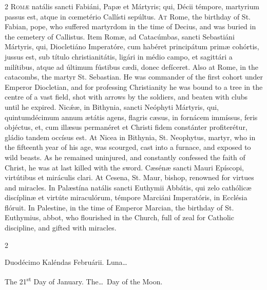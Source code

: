 \begin{paracol}{2}
\lettrine[lines=2]{R}{omæ} natális sancti Fabiáni, Papæ et Mártyris; 
 qui, Décii témpore, martyrium passus est, atque in cœmetério Callísti 
 sepúltus.
\switchcolumn
{}
\lettrine[lines=2]{A}{t} Rome, the birthday of St. Fabian, pope, who suffered martyrdom in the 
 time of Decius, and was buried in the cemetery of Callistus.
\switchcolumn*
{}
Item Romæ, ad Catacúmbas, sancti Sebastiáni 
 Mártyris, qui, Diocletiáno Imperatóre, cum habéret principátum primæ 
 cohórtis, jussus est, sub título christianitátis, ligári in médio campo, et 
 sagittári a milítibus, atque ad últimum fústibus cædi, donec defíceret.
\switchcolumn
{}
Also at Rome, in the catacombs, the martyr St. Sebastian. He was 
 commander of the first cohort under Emperor Diocletian, and for professing 
 Christianity he was bound to a tree in the centre of a vast field, shot with 
 arrows by the soldiers, and beaten with clubs until he expired.
\switchcolumn*
{}
Nicǽæ, in Bithynia, sancti Neóphyti Mártyris, 
 qui, quintumdécimum annum ætátis agens, flagris cæsus, in fornácem immíssus, 
 feris objéctus, et, cum illæsus permanéret et Christi fidem constánter 
 profiterétur, gládio tandem occísus est.
\switchcolumn
{}
At Nicea in Bithynia, St. Neophytus, martyr, who in the fifteenth year of 
 his age, was scourged, cast into a furnace, and exposed to wild beasts. 
 As he remained uninjured, and constantly confessed the faith of Christ, he 
 was at last killed with the sword.
\switchcolumn*
{}
Cæsénæ sancti Mauri Epíscopi, virtútibus et 
 miráculis clari.
\switchcolumn
{}
At Cesena, St. Maur, bishop, renowned for virtues and miracles.
\switchcolumn*
{}
In Palæstína natális sancti Euthymii Abbátis, 
 qui zelo cathólicæ discíplinæ et virtúte miraculórum, témpore Marciáni 
 Imperatóris, in Ecclésia flóruit.
\switchcolumn
{}
In Palestine, in the time of Emperor Marcian, the birthday of St. Euthymius, 
 abbot, who flourished in the Church, full of zeal for Catholic discipline, 
 and gifted with miracles.
\switchcolumn*
{}
\end{paracol}


\begin{paracol}{2}
\begin{center}{\color{gregoriocolor} Duodécimo Kaléndas Februárii. 
 Luna\dots\ }\end{center}
\switchcolumn
{}
\begin{center}{\color{gregoriocolor} The 21\textsuperscript{st} Day of 
 January. The\dots\ Day of the Moon.}\end{center}
\end{paracol}

